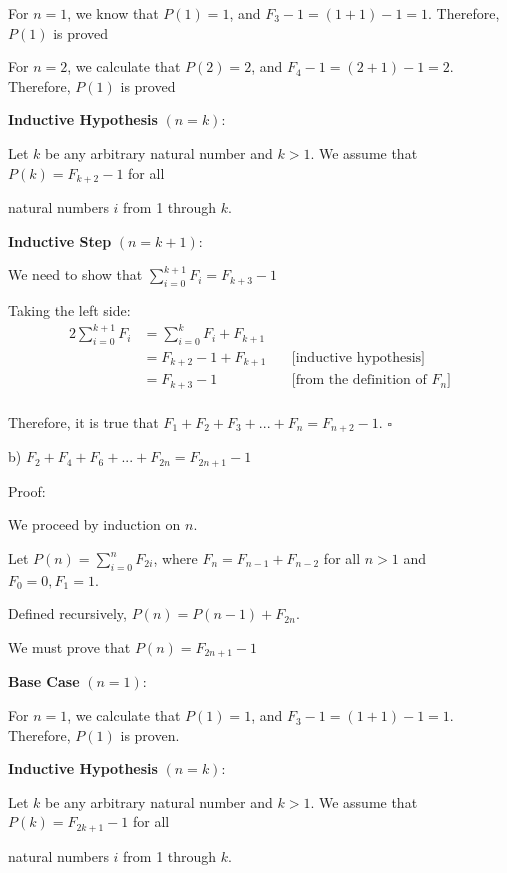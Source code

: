 \documentclass{article} %
\begin{document}
    For $n = 1$, we know that $P(1) = 1$, and $F_3 - 1 = (1 + 1) - 1 = 1$. Therefore, $P(1)$ is proved

    For $n = 2$, we calculate that $P(2) = 2$, and $F_4 - 1 = (2 + 1) - 1 = 2$. Therefore, $P(1)$ is proved

    \textbf{Inductive Hypothesis} $(n = k)$:

    Let $k$ be any arbitrary natural number and $k > 1$. We assume that $P(k) = F_{k+2} - 1$ for all
    
    natural numbers $i$ from 1 through $k$.

    \textbf{Inductive Step} $(n = k+1)$:

    We need to show that $\sum_{i = 0}^{k+1} F_i = F_{k + 3} - 1$

    Taking the left side:
    \begin{alignat*}{2}
        \sum_{i = 0}^{k+1} F_i &= \sum_{i = 0}^{k} F_i + F_{k + 1}\\
        &= F_{k + 2} - 1 + F_{k + 1}\ &&\text{[inductive hypothesis]}\\
        &= F_{k + 3} - 1 &&\text{[from the definition of $F_n$]}\\
    \end{alignat*}
    
    Therefore, it is true that $F_1 + F_2 + F_3 + ... + F_n = F_{n + 2} - 1$. $\square$

    \newpage

    b) $F_2 + F_4 + F_6 + ... + F_{2n} = F_{2n + 1} - 1$

    Proof:

    We proceed by induction on $n$.

    Let $P(n) = \sum_{i = 0}^{n} F_{2i}$, where $F_n = F_{n - 1} + F_{n - 2}$ for all $n > 1$ and $F_0 = 0, F_1 = 1$.

    Defined recursively, $P(n) = P(n - 1) + F_{2n}$.

    We must prove that $P(n) = F_{2n + 1} - 1$

    \textbf{Base Case} $(n = 1)$:

    For $n = 1$, we calculate that $P(1) = 1$, and $F_3 - 1 = (1 + 1) - 1 = 1$. Therefore, $P(1)$ is proven.

    \textbf{Inductive Hypothesis} $(n = k)$:

    Let $k$ be any arbitrary natural number and $k > 1$. We assume that $P(k) = F_{2k+1} - 1$ for all
    
    natural numbers $i$ from 1 through $k$.
\end{document}
